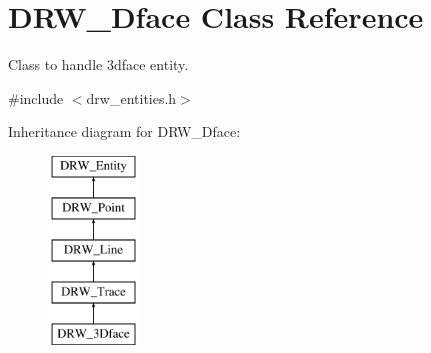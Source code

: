 \hypertarget{class_d_r_w__3_dface}{}\section{D\+R\+W\+\_\+Dface Class Reference}
\label{class_d_r_w__3_dface}


Class to handle 3dface entity.  




{\ttfamily \#include $<$drw\+\_\+entities.\+h$>$}

Inheritance diagram for D\+R\+W\+\_\+Dface\+:\begin{figure}[H]
\begin{center}
\leavevmode
\includegraphics[height=5.000000cm]{da/dec/class_d_r_w__3_dface}
\end{center}
\end{figure}
